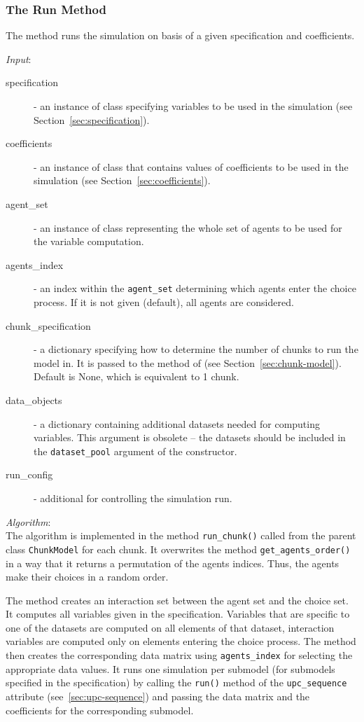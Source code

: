 \subsubsection{The Run Method}
%
The  method runs the simulation on basis of a given specification
and coefficients.

{\it Input}:
\begin{description}
\item[specification] - an instance of class 
  specifying variables to be used in the simulation (see Section~\ref{sec:specification}).
\item[coefficients] - an instance of class  that contains
  values of coefficients to be used in the simulation (see Section~\ref{sec:coefficients}).
\item[agent_set] - an instance of class  representing the whole
  set of agents to be used for the variable computation.
\item[agents_index] - an index within the \verb|agent_set| determining which
  agents enter the choice process. If it is not given (default), all agents are
  considered.
\item[chunk_specification] - a dictionary specifying how to determine the number
  of chunks to run the model in. It is  passed to the  method of 
   (see Section~\ref{sec:chunk-model}). 
  Default is None, which is equivalent to 1 chunk.
\item[data_objects] - a dictionary containing additional datasets 
  needed for computing variables. This argument is obsolete -- the datasets should be 
  included in the \verb|dataset_pool| argument of the constructor.
\item[run_config] - additional  for controlling the
  simulation run.
\end{description}


{\it Algorithm}:~\\[1mm]
The algorithm is implemented in the method \verb|run_chunk()| called from the
parent class \verb|ChunkModel| for each chunk. It overwrites the
 method \verb|get_agents_order()| in a way that it returns a
permutation of the agents indices. Thus, the agents make their choices in a
random order.

The method creates an interaction set between the agent set and the choice
set. It computes all variables given in the specification. Variables that are
specific to one of the datasets are computed on all elements of that dataset, 
interaction variables are computed only on elements entering the choice
process. The method then creates the corresponding data matrix using
\verb|agents_index| for selecting the appropriate data values. It runs one
simulation per submodel (for submodels specified in the specification) by
calling the \verb|run()| method of the \verb|upc_sequence| attribute
(see~\ref{sec:upc-sequence}) and passing the data matrix and the coefficients
for the corresponding submodel.

